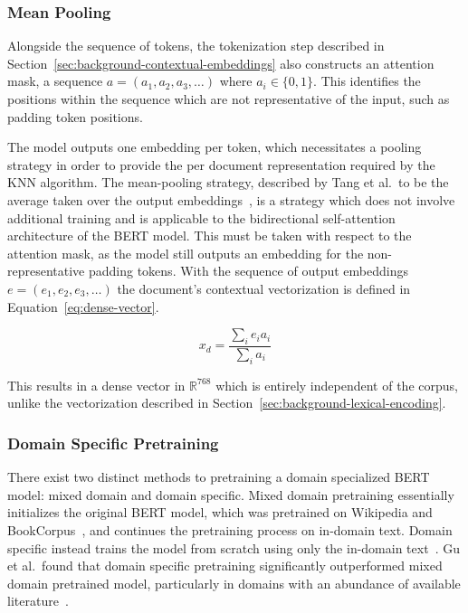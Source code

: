 \documentclass[11pt]{article}
\theoremstyle{plain}
\theoremstyle{definition}
\begin{document}
\subsubsection{Mean Pooling}\label{sec:background-contextual-pooling}

Alongside the sequence of tokens, the tokenization step described in Section~\ref{sec:background-contextual-embeddings} also constructs an attention mask, a sequence $a=(a_1, a_2,a_3,\dots)$ where $a_i \in \{0,1\}$. This identifies the positions within the sequence which are not representative of the input, such as padding token positions.

The model outputs one embedding per token, which necessitates a pooling strategy in order to provide the per document representation required by the KNN algorithm. The mean-pooling strategy, described by Tang et al.\ to be the average taken over the output embeddings~\cite{tang/2024/pooling}, is a strategy which does not involve additional training and is applicable to the bidirectional self-attention architecture of the BERT model. This must be taken with respect to the attention mask, as the model still outputs an embedding for the non-representative padding tokens. With the sequence of output embeddings $e=(e_1, e_2, e_3, \dots)$ the document's contextual vectorization is defined in Equation~\ref{eq:dense-vector}.

\begin{equation}\label{eq:dense-vector}
    x_d = \frac{\sum_{i} {e_i}{a_i}}{\sum_{i} a_i}
\end{equation}

This results in a dense vector in $\mathbb{R}^{768}$ which is entirely independent of the corpus, unlike the vectorization described in Section~\ref{sec:background-lexical-encoding}.

\subsubsection{Domain Specific Pretraining}\label{sec:background-contextual-domain}

There exist two distinct methods to pretraining a domain specialized BERT model: mixed domain and domain specific. Mixed domain pretraining essentially initializes the original BERT model, which was pretrained on Wikipedia and BookCorpus~\cite{devlin/2018/bert}, and continues the pretraining process on in-domain text. Domain specific instead trains the model from scratch using only the in-domain text~\cite{gu/2021/domainspecific}.  Gu et al.\ found that domain specific pretraining significantly outperformed mixed domain pretrained model, particularly in domains with an abundance of available literature~\cite{gu/2021/domainspecific}.
\end{document}
